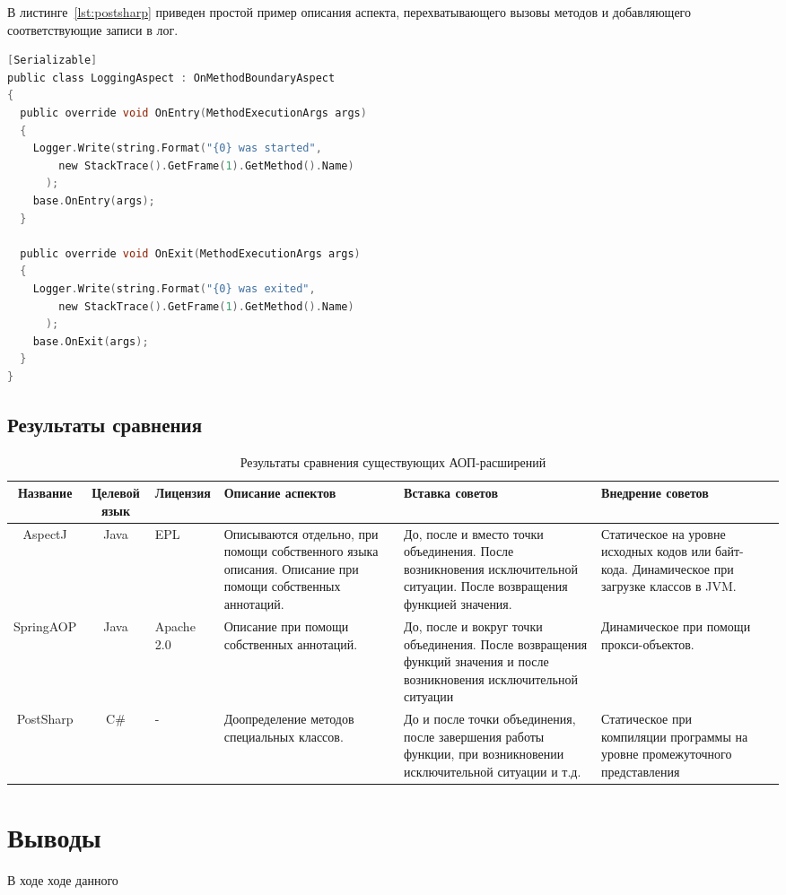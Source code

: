   В листинге~\ref{lst:postsharp} приведен простой пример описания аспекта, 
  перехватывающего вызовы методов и добавляющего соответствующие записи в лог.
  \begin{lstlisting}[language=C, label={lst:postsharp}, caption={Пример 
  описания аспекта при помощи PostSharp.}]
[Serializable]
public class LoggingAspect : OnMethodBoundaryAspect
{
  public override void OnEntry(MethodExecutionArgs args)
  {
    Logger.Write(string.Format("{0} was started",
        new StackTrace().GetFrame(1).GetMethod().Name)
      );
    base.OnEntry(args);
  }
 
  public override void OnExit(MethodExecutionArgs args)
  {
    Logger.Write(string.Format("{0} was exited",
        new StackTrace().GetFrame(1).GetMethod().Name)
      );
    base.OnExit(args);
  }
}
  \end{lstlisting}
\subsection{Результаты сравнения}
\label{sub:comparison_results}
\begin{sidewaystable}
\caption{Результаты сравнения существующих АОП-расширений}
\scriptsize
\begin{tabularx}{\textwidth}{|c|c|X|X|X|X|X|}
\hline
Название & Целевой язык & Лицензия & Описание аспектов & Вставка советов& Внедрение советов \\ \hline
AspectJ & Java & EPL & Описываются отдельно, при помощи собственного языка описания. Описание при помощи собственных аннотаций. & До, после и вместо точки объединения. После возникновения исключительной ситуации. После возвращения функцией значения. & Статическое на уровне исходных кодов или байт-кода. Динамическое при загрузке классов в JVM. \\ \hline
SpringAOP & Java & Apache 2.0 & Описание при помощи собственных аннотаций. & До, после и вокруг точки объединения. После возвращения функций значения и после возникновения исключительной ситуации & Динамическое при помощи прокси-объектов. \\ \hline
PostSharp & C\# & - & Доопределение методов специальных классов. & До и после точки объединения, после завершения работы функции, при возникновении исключительной ситуации и т.д. & Статическое при компиляции программы на уровне промежуточного представления \\ \hline
\end{tabularx}
\label{tab:comparison_results}
\end{sidewaystable}
\section{Выводы}
\label{sec:cap_1_conclusion}
В ходе ходе данного

